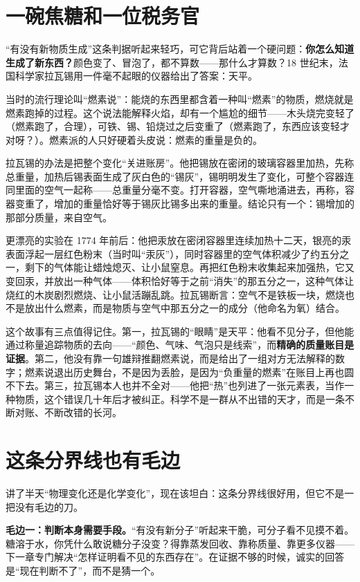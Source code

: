 \section{一碗焦糖和一位税务官}

\begin{zhengju}
“有没有新物质生成”这条判据听起来轻巧，可它背后站着一个硬问题：\textbf{你怎么知道生成了新东西？}颜色变了、冒泡了，都不算数——那什么才算数？18 世纪末，法国科学家拉瓦锡用一件毫不起眼的仪器给出了答案：天平。

当时的流行理论叫“燃素说”：能烧的东西里都含着一种叫“燃素”的物质，燃烧就是燃素跑掉的过程。这个说法能解释火焰，却有一个尴尬的细节——木头烧完变轻了（燃素跑了，合理），可铁、锡、铅烧过之后变重了（燃素跑了，东西应该变轻才对呀？）。燃素派的人只好硬着头皮说：燃素的重量是负的。

拉瓦锡的办法是把整个变化“关进账房”。他把锡放在密闭的玻璃容器里加热，先称总重量，加热后锡表面生成了灰白色的“锡灰”，锡明明发生了变化，可整个容器连同里面的空气一起称——总重量分毫不变。打开容器，空气嘶地涌进去，再称，容器变重了，增加的重量恰好等于锡灰比锡多出来的重量。结论只有一个：锡增加的那部分质量，来自空气。

更漂亮的实验在 1774 年前后：他把汞放在密闭容器里连续加热十二天，银亮的汞表面浮起一层红色粉末（当时叫“汞灰”），同时容器里的空气体积减少了约五分之一，剩下的气体能让蜡烛熄灭、让小鼠窒息。再把红色粉末收集起来加强热，它又变回汞，并放出一种气体——体积恰好等于之前“消失”的那五分之一，这种气体让烧红的木炭剧烈燃烧、让小鼠活蹦乱跳。拉瓦锡断言：空气不是铁板一块，燃烧也不是放出什么燃素，而是物质与空气中那五分之一的成分（他命名为氧）结合。

这个故事有三点值得记住。第一，拉瓦锡的“眼睛”是天平：他看不见分子，但他能通过称量追踪物质的去向——“颜色、气味、气泡只是线索”，而\textbf{精确的质量账目是证据}。第二，他没有靠一句雄辩推翻燃素说，而是给出了一组对方无法解释的数字；燃素说退出历史舞台，不是因为丢脸，是因为“负重量的燃素”在账目上再也圆不下去。第三，拉瓦锡本人也并不全对——他把“热”也列进了一张元素表，当作一种物质，这个错误几十年后才被纠正。科学不是一群从不出错的天才，而是一条不断对账、不断改错的长河。
\end{zhengju}

\section{这条分界线也有毛边}

讲了半天“物理变化还是化学变化”，现在该坦白：这条分界线很好用，但它不是一把没有毛边的刀。

\textbf{毛边一：判断本身需要手段。}“有没有新分子”听起来干脆，可分子看不见摸不着。糖溶于水，你凭什么敢说糖分子没变？得靠蒸发回收、靠称质量、靠更多仪器——下一章专门解决“怎样证明看不见的东西存在”。在证据不够的时候，诚实的回答是“现在判断不了”，而不是猜一个。

